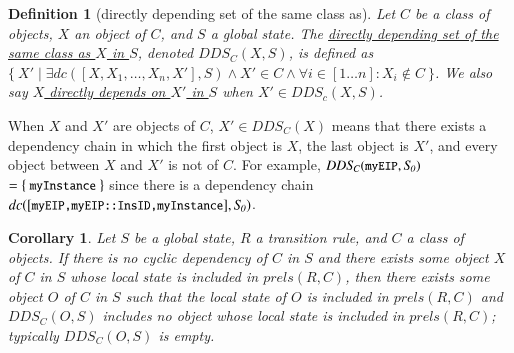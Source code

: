 \documentclass[12pt]{report}
\newtheorem{corollary}{Corollary}
\newtheorem{definition}{Definition}
\newcommand{\mbstt}[1]{\mbox{\small{\tt {#1}}}}
\newcommand{\ul}{\underline}
\begin{document}
\begin{definition}[directly depending set of the same class as]
Let $C$ be a class of objects, $X$ an object of $C$, and $S$ a
global state. The \ul{directly depending set of the same class as $X$
  in $S$}\!, denoted \ul{$\mathit{DDS_C}(X,S)$}, is defined as $\{~X'\mid\exists
dc([X,X_1,\dots,X_n,X'],S)\land X' \in C\land\forall i\in [1 \dots
  n]:X_i \not\in C~\}$. We also say \ul{$X$ directly depends on $X'$
  in $S$} when $X'\in \mathit{DDS_c}(X,S)$.
\end{definition}
When $X$ and $X'$ are objects of $C$, $X' \in \mathit{DDS_C}(X)$ means that
there exists a dependency chain in which the first object is $X$, the
last object is $X'$, and every object between $X$ and $X'$ is not of
$C$. For example, $\mathit{DDS_C}(\mbstt{myEIP},\mathit{S_0})$ $=\{~\mbstt{myInstance}~\}$
since there is a dependency chain
$dc([\mbstt{myEIP,myEIP::InsID,myInstance}],\mathit{S_0})$.

\begin{corollary}
Let $S$ be a global state, $R$ a transition rule, and $C$ a
class of objects. If there is no cyclic dependency of $C$ in $S$ and
there exists some object $X$ of $C$ in $S$ whose local state is
included in $prels(R,C)$, then there exists some object $O$ of $C$ in
$S$ such that the local state of $O$ is included in $prels(R,C)$ and
$\mathit{DDS_C}(O,S)$ includes no object whose local state is included in
$prels(R,C)$; typically $\mathit{DDS_C}(O,S)$ is empty.
\end{corollary}
\end{document}

